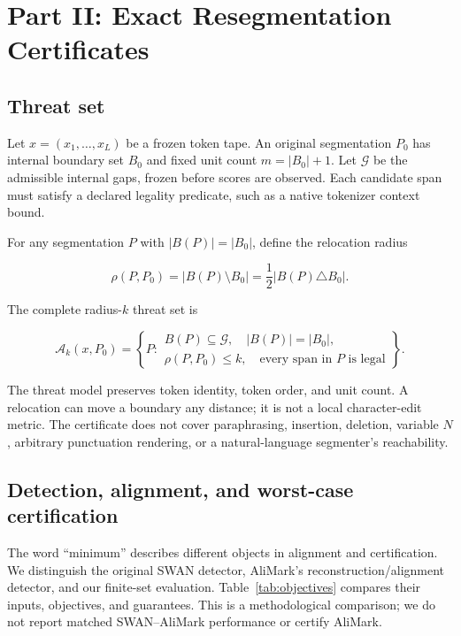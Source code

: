 \documentclass[10pt]{article}
\begin{document}
\section{Part II: Exact Resegmentation Certificates}

\subsection{Threat set}

Let $x=(x_1,\ldots,x_L)$ be a frozen token tape. An original segmentation
$P_0$ has internal boundary set $B_0$ and fixed unit count
$m=|B_0|+1$. Let $\mathcal G$ be the admissible internal gaps, frozen before
scores are observed. Each candidate span must satisfy a declared legality
predicate, such as a native tokenizer context bound.

For any segmentation $P$ with $|B(P)|=|B_0|$, define the relocation radius

\begin{equation}
\rho(P,P_0)=|B(P)\setminus B_0|
           =\frac{1}{2}|B(P)\triangle B_0|.
\end{equation}

The complete radius-$k$ threat set is

\begin{equation}
\mathcal A_k(x,P_0)=
\left\{P:
\begin{array}{l}
B(P)\subseteq\mathcal G,\quad |B(P)|=|B_0|,\\
\rho(P,P_0)\leq k,\quad
\text{every span in }P\text{ is legal}
\end{array}
\right\}.
\label{eq:threat}
\end{equation}

The threat model preserves token identity, token order, and unit count. A
relocation can move a boundary any distance; it is not a local character-edit
metric. The certificate does not cover paraphrasing, insertion, deletion,
variable $N$, arbitrary punctuation rendering, or a natural-language
segmenter's reachability.

\subsection{Detection, alignment, and worst-case certification}
\label{sec:objectives}

The word ``minimum'' describes different objects in alignment and
certification. We distinguish the original SWAN detector, AliMark's
reconstruction/alignment detector, and our finite-set evaluation.
Table~\ref{tab:objectives} compares their inputs, objectives, and guarantees.
This is a methodological comparison; we do not report matched SWAN--AliMark
performance or certify AliMark.
\end{document}
